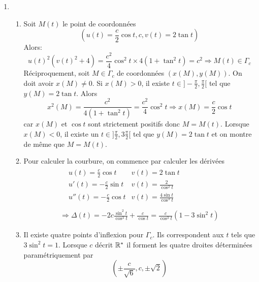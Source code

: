 \begin{enumerate}
 \item
\begin{enumerate}
 \item Soit $M(t)$ le point de coordonnées 
\begin{displaymath}
 (u(t)=\frac{c}{2}\cos t,c, v(t) = 2\tan t)
\end{displaymath}
Alors:
\begin{displaymath}
 u(t)^2(v(t)^2+4)=\frac{c^2}{4}\cos^2t\times 4(1+\tan^2t)=c^2 \Rightarrow M(t)\in \Gamma_c
\end{displaymath}
Réciproquement, soit $M\in \Gamma_c$ de coordonnées $(x(M),y(M))$. On doit avoir $x(M)\neq 0$.\newline
Si $x(M)>0$, il existe $t\in]-\frac{\pi}{2},\frac{\pi}{2}[$ tel que $y(M)=2\tan t$. Alors
\begin{displaymath}
 x^2(M)=\frac{c^2}{4(1+\tan^2t)}=\frac{c^2}{4}\cos^2 t \Rightarrow x(M)=\frac{c}{2}\cos t
\end{displaymath}
car $x(M)$ et $\cos t$ sont strictement positifs donc $M=M(t)$.\newline
Lorsque $x(M)<0$, il existe un $t\in ]\frac{\pi}{2},3\frac{\pi}{2}[$ tel que $y(M)=2\tan t$ et on montre de même que $M=M(t)$.
 \item Pour calculer la courbure, on commence par calculer les dérivées
\begin{multline*}
 \begin{aligned}
  &u(t)=\frac{c}{2}\cos t & v(t)=2\tan t \\
  &u'(t) = -\frac{c}{2}\sin t & v(t)=\frac{2}{\cos^2 t} \\
  &u''(t) = -\frac{c}{2}\cos t & v(t)=\frac{4\sin t}{\cos^3 t} \\
 \end{aligned} \\
\Rightarrow
\Delta(t)=-2c\frac{\sin^2t}{\cos^3t}+\frac{c}{\cos t}
= \frac{c}{\cos^3 t}(1-3\sin^2t)
\end{multline*}

 \item  Il existe quatre points d'inflexion pour $\Gamma_c$. Ils correspondent aux $t$ tels que $3\sin^2t =1$. Lorsque $c$ décrit $\mathbb{R}^*$ il forment les quatre droites déterminées paramétriquement par
\begin{displaymath}
 (\pm \frac{c}{\sqrt{6}},c,\pm \sqrt{2})
\end{displaymath}

\end{enumerate}

\end{enumerate}
